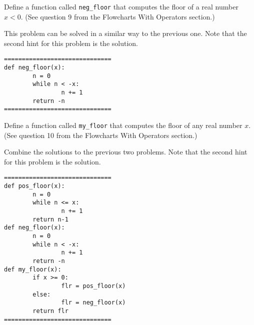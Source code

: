 \documentclass{ximera}
\begin{document}
\begin{question}
	Define a function called \verb|neg_floor| that computes the floor of a real number $x<0$. (See question 9 from the Flowcharts With Operators section.)
	\begin{hint}
	This problem can be solved in a similar way to the previous one. Note that the second hint for this problem is the solution.
	\end{hint}
	\begin{hint}
\begin{verbatim}
==============================
def neg_floor(x):
        n = 0
        while n < -x:
                n += 1
        return -n
==============================
\end{verbatim}
	\end{hint}
\end{question}

\begin{question}
	Define a function called \verb|my_floor| that computes the floor of any real number $x$. (See question 10 from the Flowcharts With Operators section.)
	\begin{hint}
	Combine the solutions to the previous two problems. Note that the second hint for this problem is the solution.
	\end{hint}
	\begin{hint}
\begin{verbatim}
==============================
def pos_floor(x):
        n = 0
        while n <= x:
                n += 1
        return n-1
def neg_floor(x):
        n = 0
        while n < -x:
                n += 1
        return -n
def my_floor(x):
        if x >= 0:
                flr = pos_floor(x)
        else:
                flr = neg_floor(x)
        return flr
==============================
\end{verbatim}
	\end{hint}
\end{question}
\end{document}
